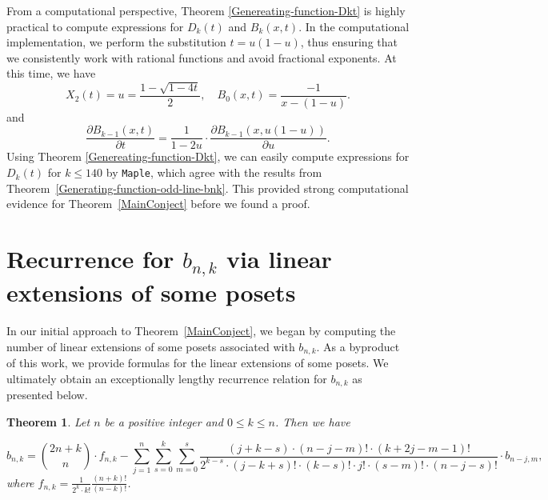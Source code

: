 \documentclass[reqno, 12pt]{article}
\newtheorem{thm}{Theorem}[section]
\theoremstyle{mydefinition}
\theoremstyle{myremark}
\numberwithin{algorithm}{section}
\begin{document}
From a computational perspective, Theorem \ref{Genereating-function-Dkt} is highly practical to compute expressions for $D_k(t)$ and $B_k(x,t)$.
In the computational implementation, we perform the substitution $t=u(1-u)$, thus ensuring that we consistently work with rational functions and avoid fractional exponents. At this time, we have
$$X_2(t)=u=\frac{1-\sqrt{1-4t}}{2},\quad B_0(x,t)=\frac{-1}{x-(1-u)}.$$
and
$$\frac{\partial B_{k-1}(x,t)}{\partial t}=\frac{1}{1-2u}\cdot \frac{\partial B_{k-1}(x,u(1-u))}{\partial u}.$$
Using Theorem \ref{Genereating-function-Dkt}, we can easily compute expressions for $D_k(t)$ for $k\leq 140$ by \texttt{Maple}, which agree with the results from Theorem~\ref{Generating-function-odd-line-bnk}. This provided strong computational evidence for Theorem~\ref{MainConject} before we found a proof.

\section{Recurrence for $b_{n,k}$ via linear extensions of some posets}
\label{sec:LExten}

In our initial approach to Theorem~\ref{MainConject}, we began by computing the number of linear extensions of some posets associated with $b_{n,k}$.
As a byproduct of this work, we provide formulas for the linear extensions of some posets.
We ultimately obtain an exceptionally lengthy recurrence relation for $b_{n,k}$ as presented below.

\begin{thm}\label{bnk-formula-Recu-three}
Let $n$ be a positive integer and $0\leq k\leq n$. Then we have
\begin{small}
\begin{equation*}
b_{n,k}=\binom{2n+k}{n}\cdot f_{n,k}-\sum_{j=1}^n \sum_{s=0}^k \sum_{m=0}^s
\frac{(j+k-s)\cdot(n-j-m)!\cdot(k+2j-m-1)!}{2^{k-s}\cdot (j-k+s)!\cdot(k-s)!\cdot j!\cdot (s-m)!\cdot(n-j-s)!}\cdot b_{n-j,m},
\end{equation*}
where $f_{n,k}=\frac{1}{2^k\cdot k!}\frac{(n+k)!}{(n-k)!}$.
\end{small}
\end{thm}
\end{document}
